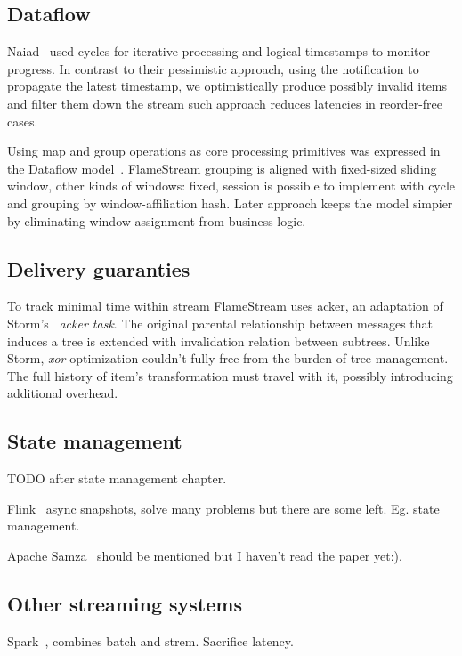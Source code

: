 
\label {fs-related-section}

\subsection{Dataflow}
Naiad~\cite{Murray:2013:NTD:2517349.2522738} used cycles for iterative processing and logical timestamps to monitor progress. In contrast to their pessimistic approach, using the notification to propagate the latest timestamp, we optimistically produce possibly invalid items and filter them down the stream such approach reduces latencies in reorder-free cases.

Using map and group operations as core processing primitives was expressed in the Dataflow model~\cite{Akidau:2015:DMP:2824032.2824076}. FlameStream grouping is aligned with fixed-sized sliding window, other kinds of windows: fixed, session is possible to implement with cycle and grouping by window-affiliation hash. Later approach keeps the model simpier by eliminating window assignment from business logic.

\subsection{Delivery guaranties}
To track minimal time within stream FlameStream uses acker, an adaptation of Storm's~\cite{apache:storm} {\it acker task}. The original parental relationship between messages that induces a tree is extended with invalidation relation between subtrees. Unlike Storm, {\it xor} optimization couldn't fully free from the burden of tree management. The full history of item's transformation must travel with it, possibly introducing additional overhead.

\subsection{State management}
TODO after state management chapter.

Flink~\cite{carbone2015apache} async snapshots, solve many problems but there are some left. Eg. state management.

Apache Samza~\cite{Noghabi:2017:SSS:3137765.3137770} should be mentioned but I haven't read the paper yet:).

\subsection{Other streaming systems}
Spark~\cite{Zaharia:2012:DSE:2342763.2342773}, combines batch and strem. Sacrifice latency.

